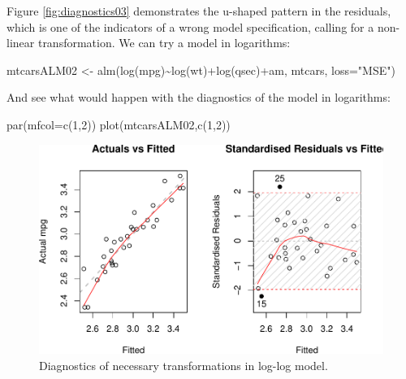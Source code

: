 \documentclass[
]{book}
\newenvironment{Shaded}{\begin{snugshade}}{\end{snugshade}}
\newcommand{\AttributeTok}[1]{\textcolor[rgb]{0.77,0.63,0.00}{#1}}
\newcommand{\DecValTok}[1]{\textcolor[rgb]{0.00,0.00,0.81}{#1}}
\newcommand{\FunctionTok}[1]{\textcolor[rgb]{0.00,0.00,0.00}{#1}}
\newcommand{\NormalTok}[1]{#1}
\newcommand{\OtherTok}[1]{\textcolor[rgb]{0.56,0.35,0.01}{#1}}
\newcommand{\SpecialCharTok}[1]{\textcolor[rgb]{0.00,0.00,0.00}{#1}}
\newcommand{\StringTok}[1]{\textcolor[rgb]{0.31,0.60,0.02}{#1}}
\theoremstyle{definition}
\theoremstyle{definition}
\theoremstyle{definition}
\theoremstyle{definition}
\theoremstyle{remark}
\begin{document}
Figure \ref{fig:diagnostics03} demonstrates the u-shaped pattern in the residuals, which is one of the indicators of a wrong model specification, calling for a non-linear transformation. We can try a model in logarithms:

\begin{Shaded}
\begin{Highlighting}[]
\NormalTok{mtcarsALM02 }\OtherTok{\textless{}{-}} \FunctionTok{alm}\NormalTok{(}\FunctionTok{log}\NormalTok{(mpg)}\SpecialCharTok{\textasciitilde{}}\FunctionTok{log}\NormalTok{(wt)}\SpecialCharTok{+}\FunctionTok{log}\NormalTok{(qsec)}\SpecialCharTok{+}\NormalTok{am, mtcars, }\AttributeTok{loss=}\StringTok{"MSE"}\NormalTok{)}
\end{Highlighting}
\end{Shaded}

And see what would happen with the diagnostics of the model in logarithms:

\begin{Shaded}
\begin{Highlighting}[]
\FunctionTok{par}\NormalTok{(}\AttributeTok{mfcol=}\FunctionTok{c}\NormalTok{(}\DecValTok{1}\NormalTok{,}\DecValTok{2}\NormalTok{))}
\FunctionTok{plot}\NormalTok{(mtcarsALM02,}\FunctionTok{c}\NormalTok{(}\DecValTok{1}\NormalTok{,}\DecValTok{2}\NormalTok{))}
\end{Highlighting}
\end{Shaded}

\begin{figure}
\centering
\includegraphics{Svetunkov---Statistics-for-Business-Analytics_files/figure-latex/diagnostics04-1.pdf}
\caption{\label{fig:diagnostics04}Diagnostics of necessary transformations in log-log model.}
\end{figure}
\end{document}
